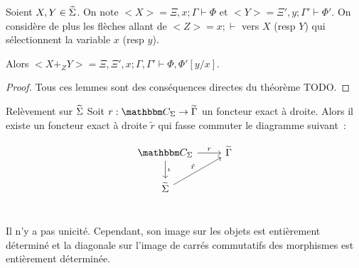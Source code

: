 \begin{lem}
    Soient $X,Y\in\widetilde{\Sigma}$. On note $<X> = \Xi,x;\Gamma\vdash\Phi$ et
    $<Y> = \Xi',y;\Gamma'\vdash\Phi'$. On considère de plus les flèches allant de
    $<Z> = x;\vdash$ vers $X$ (resp $Y$) qui sélectionnent la variable $x$ (resp $y$).

    Alors $<X +_Z Y> = \Xi,\Xi',x;\Gamma,\Gamma'\vdash\Phi,\Phi'[y/x]$.
\end{lem}

\begin{proof}
    Tous ces lemmes sont des conséquences directes du théorème TODO.
\end{proof}

\begin{theo}{Relèvement sur $\widetilde{\Sigma}$}
    Soit $r : \C_\Sigma\rightarrow\tgamma$ un foncteur exact à droite. Alors il
    existe un foncteur exact à droite $\tilde{r}$ qui fasse commuter le
    diagramme suivant~:

    \[\begin{tikzcd}
        \C_\Sigma\arrow[d, "\iota"]\arrow[r, "r"] & \tgamma \\
        \tsigma\arrow[ur, "\tilde{r}"] & \\
    \end{tikzcd}\]

    Il n'y a pas unicité. Cependant, son image sur les objets est entièrement déterminé
    et la diagonale sur l'image de carrés commutatifs des morphismes est entièrement
    déterminée.
\end{theo}

